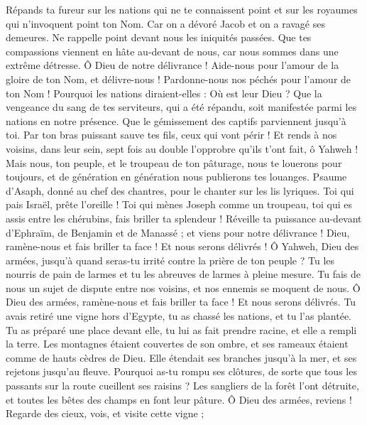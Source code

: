 \begin{multicols}{2}
Répands ta fureur sur les nations qui ne te connaissent point et sur les royaumes qui n'invoquent point ton Nom.
Car on a dévoré Jacob et on a ravagé ses demeures.
Ne rappelle point devant nous les iniquités passées. Que tes compassions viennent en hâte au-devant de nous, car nous sommes dans une extrême détresse.
Ô Dieu de notre délivrance ! Aide-nous pour l'amour de la gloire de ton Nom, et délivre-nous ! Pardonne-nous nos péchés pour l'amour de ton Nom !
Pourquoi les nations diraient-elles : Où est leur Dieu ? Que la vengeance du sang de tes serviteurs, qui a été répandu, soit manifestée parmi les nations en notre présence.
Que le gémissement des captifs parviennent jusqu'à toi. Par ton bras puissant sauve tes fils, ceux qui vont périr !
Et rends à nos voisins, dans leur sein, sept fois au double l'opprobre qu'ils t'ont fait, ô Yahweh !
Mais nous, ton peuple, et le troupeau de ton pâturage, nous te louerons pour toujours, et de génération en génération nous publierons tes louanges.
\VerseOne{}Psaume d'Asaph, donné au chef des chantres, pour le chanter sur les lis lyriques.
Toi qui pais Israël, prête l'oreille ! Toi qui mènes Joseph comme un troupeau, toi qui es assis entre les chérubins, fais briller ta splendeur !
Réveille ta puissance au-devant d'Ephraïm, de Benjamin et de Manassé ; et viens pour notre délivrance !
Dieu, ramène-nous et fais briller ta face ! Et nous serons délivrés !
Ô Yahweh, Dieu des armées, jusqu'à quand seras-tu irrité contre la prière de ton peuple ?
Tu les nourris de pain de larmes et tu les abreuves de larmes à pleine mesure.
Tu fais de nous un sujet de dispute entre nos voisins, et nos ennemis se moquent de nous.
Ô Dieu des armées, ramène-nous et fais briller ta face ! Et nous serons délivrés.
Tu avais retiré une vigne hors d'Egypte, tu as chassé les nations, et tu l'as plantée.
Tu as préparé une place devant elle, tu lui as fait prendre racine, et elle a rempli la terre.
Les montagnes étaient couvertes de son ombre, et ses rameaux étaient comme de hauts cèdres de Dieu.
Elle étendait ses branches jusqu'à la mer, et ses rejetons jusqu'au fleuve.
Pourquoi as-tu rompu ses clôtures, de sorte que tous les passants sur la route cueillent ses raisins ?
Les sangliers de la forêt l'ont détruite, et toutes les bêtes des champs en font leur pâture.
Ô Dieu des armées, reviens ! Regarde des cieux, vois, et visite cette vigne ;

\end{multicols}
